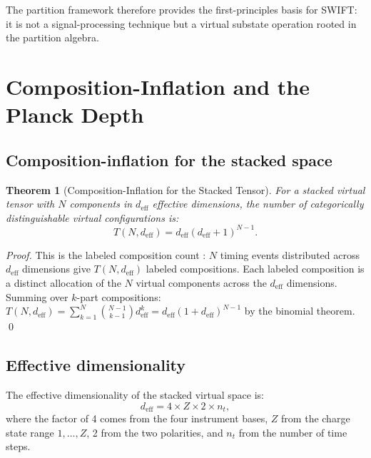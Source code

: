\documentclass[twocolumn,10pt,a4paper]{article}
\theoremstyle{thmstyle}
\newtheorem{theorem}{Theorem}[section]
\theoremstyle{definition}
\theoremstyle{remark}
\begin{document}
The partition framework therefore provides the first-principles basis
for SWIFT: it is not a signal-processing technique but a virtual
substate operation rooted in the partition algebra.

\section{Composition-Inflation and the Planck Depth}
\label{sec:inflation}

\subsection{Composition-inflation for the stacked space}

\begin{theorem}[Composition-Inflation for the Stacked Tensor]
\label{thm:inflation}
For a stacked virtual tensor with $N$ components in $d_{\text{eff}}$
effective dimensions, the number of categorically distinguishable
virtual configurations is:
\begin{equation}
T(N, d_{\text{eff}}) = d_{\text{eff}}(d_{\text{eff}} + 1)^{N-1}.
\label{eq:inflation}
\end{equation}
\end{theorem}

\begin{proof}
This is the labeled composition count \citep{andrews1976}: $N$ timing
events distributed across $d_{\text{eff}}$ dimensions give $T(N, d_{\text{eff}})$
labeled compositions. Each labeled composition is a distinct allocation
of the $N$ virtual components across the $d_{\text{eff}}$ dimensions.
Summing over $k$-part compositions:
$T(N, d_{\text{eff}}) = \sum_{k=1}^{N}\binom{N-1}{k-1}d_{\text{eff}}^k
= d_{\text{eff}}(1 + d_{\text{eff}})^{N-1}$
by the binomial theorem. \qed
\end{proof}

\subsection{Effective dimensionality}

The effective dimensionality of the stacked virtual space is:
\begin{equation}
d_{\text{eff}} = 4 \times Z \times 2 \times n_t,
\label{eq:deff}
\end{equation}
where the factor of 4 comes from the four instrument bases, $Z$ from
the charge state range $1, \ldots, Z$, 2 from the two polarities, and
$n_t$ from the number of time steps.
\end{document}
